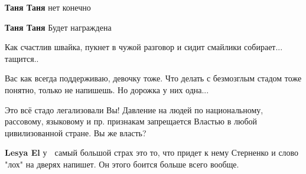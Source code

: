 \begin{itemize}
\begin{itemize}
\textbf{Таня Таня} нет конечно

 
\textbf{Таня Таня} Будет награждена
\end{itemize}

 
Как счастлив швайка, пукнет в чужой разговор и сидит смайлики собирает... тащится..

 
Вас как всегда поддерживаю, девочку тоже. Что делать с безмозглым стадом тоже
понятно, только не напишешь. Но дорожка у них одна...


 

Это всё стадо легализовали Вы! Давление на людей по национальному, рассовому,
языковому и пр. признакам запрещается Властью в любой цивилизованной стране. Вы
же власть?

\begin{itemize}
 
\textbf{Lesya El} у 🤡 самый большой страх это то, что придет к нему Стерненко и слово "лох" на дверях напишет. Он этого боится больше всего вообще.

 

\end{itemize}
\end{itemize}
